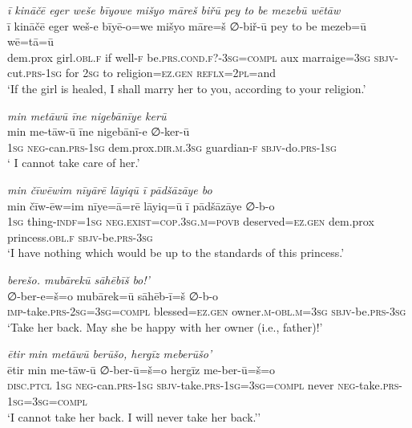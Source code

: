 \ea \label{ZP.100}
\textit{ī kināčē eger weše bīyowe mišyo māreš biřū pey to be mezebū wētāw} \\ 
\gll ī kināčē eger weš-e bīyē-o=we mišyo māre=š ∅-biř-ū pey to be mezeb=ū wē=tā=ū \\ 
 dem.prox girl\textsc{.obl}\textsc{.f} if well\textsc{-f} be\textsc{.prs}.\textsc{cond}\textsc{.f}?\textsc{-3sg}\textsc{=compl} aux marraige\textsc{=3sg} \textsc{sbjv-}cut\textsc{.prs}\textsc{-\textsc{1sg}} for \textsc{2sg} to religion\textsc{\textsc{=ez.gen}} \textsc{reflx}=\textsc{2pl}=and \\ 
\glt `If the girl is healed, I shall marry her to you, according to your religion.'
\z 
 
\ea \label{ZP.103}
\textit{min metāwū īne nigebānīye kerū} \\ 
\gll min me-tāw-ū īne nigebānī-e ∅-ker-ū \\ 
 \textsc{1sg} \textsc{neg-}can\textsc{.prs}\textsc{-\textsc{1sg}} dem.prox\textsc{.dir}\textsc{.m}\textsc{.3sg} guardian\textsc{-f} \textsc{sbjv-}do\textsc{.prs}\textsc{-\textsc{1sg}} \\ 
\glt ` I cannot take care of her.'
\z 
 
\ea \label{ZP.105}
\textit{min čīwēwim nīyārē lāyiqū ī pādšāzāye bo} \\ 
\gll min čīw-ēw=im nīye=ā=rē lāyiq=ū ī pādšāzāye ∅-b-o \\ 
 \textsc{1sg} thing\textsc{-indf}\textsc{=\textsc{1sg}} \textsc{\textsc{neg.}exist}\textsc{=cop}\textsc{.3sg}\textsc{.m}\textsc{=\textsc{povb}} deserved\textsc{\textsc{=ez.gen}} dem.prox princess\textsc{.obl}\textsc{.f} \textsc{sbjv-}be\textsc{.prs}\textsc{-3sg} \\ 
\glt `I have nothing which would be up to the standards of this princess.'
\z 
 
\ea \label{ZP.106}
\textit{berešo. mubārekū sāhēbīš bo!’} \\ 
\gll ∅-ber-e=š=o mubārek=ū sāhēb-ī=š ∅-b-o \\ 
 \textsc{imp-}take\textsc{.prs}-\textsc{2sg}\textsc{=3sg}\textsc{=compl} blessed\textsc{\textsc{=ez.gen}} owner\textsc{.m}\textsc{-obl}\textsc{.m}\textsc{=3sg} \textsc{sbjv-}be\textsc{.prs}\textsc{-3sg} \\ 
\glt `Take her back. May she be happy with her owner (i.e., father)!'
\z 
 
\ea \label{ZP.109}
\textit{ētir min metāwū berūšo, hergīz meberūšo’} \\ 
\gll ētir min me-tāw-ū ∅-ber-ū=š=o hergīz me-ber-ū=š=o \\ 
 \textsc{disc.ptcl} \textsc{1sg} \textsc{neg-}can\textsc{.prs}\textsc{-\textsc{1sg}} \textsc{sbjv-}take\textsc{.prs}\textsc{-\textsc{1sg}}\textsc{=3sg}\textsc{=compl} never \textsc{neg-}take\textsc{.prs}\textsc{-\textsc{1sg}}\textsc{=3sg}\textsc{=compl} \\ 
\glt `I cannot take her back. I will never take her back.’'
\z 
 
